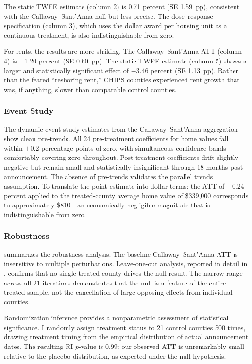 \documentclass[12pt]{article}
\begin{document}
The static TWFE estimate (column 2) is 0.71 percent (SE 1.59~pp), consistent with the Callaway--Sant'Anna null but less precise. The dose--response specification (column 3), which uses the dollar award per housing unit as a continuous treatment, is also indistinguishable from zero.

For rents, the results are more striking. The Callaway--Sant'Anna ATT (column 4) is $-$1.20 percent (SE 0.60~pp). The static TWFE estimate (column 5) shows a larger and statistically significant effect of $-$3.46 percent (SE 1.13~pp). Rather than the feared ``reshoring rent,'' CHIPS counties experienced rent growth that was, if anything, slower than comparable control counties.



\subsubsection*{Event Study} The dynamic event-study estimates from the Callaway--Sant'Anna aggregation show clean pre-trends. All 24 pre-treatment coefficients for home values fall within $\pm$0.2 percentage points of zero, with simultaneous confidence bands comfortably covering zero throughout. Post-treatment coefficients drift slightly negative but remain small and statistically insignificant through 18 months post-announcement. The absence of pre-trends validates the parallel trends assumption. To translate the point estimate into dollar terms: the ATT of $-$0.24 percent applied to the treated-county average home value of \$339,000 corresponds to approximately \$810---an economically negligible magnitude that is indistinguishable from zero.

\subsubsection*{Robustness}  summarizes the robustness analysis. The baseline Callaway--Sant'Anna ATT is insensitive to multiple perturbations. Leave-one-out analysis, reported in detail in , confirms that no single treated county drives the null result. The narrow range across all 21 iterations demonstrates that the null is a feature of the entire treated sample, not the cancellation of large opposing effects from individual counties.

Randomization inference provides a nonparametric assessment of statistical significance. I randomly assign treatment status to 21 control counties 500 times, drawing treatment timing from the empirical distribution of actual announcement dates. The resulting RI $p$-value is 0.99: our observed ATT is unremarkably small relative to the placebo distribution, as expected under the null hypothesis.
\end{document}
